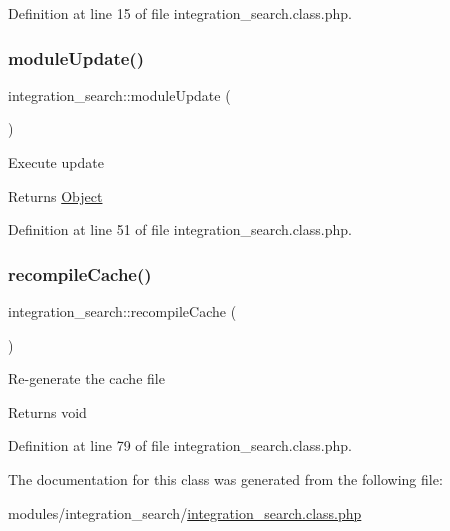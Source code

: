 Definition at line 15 of file integration\+\_\+search.\+class.\+php.

\hypertarget{classintegration__search_a4a0b59c788e9240fada3131b35ef273c}{}\label{classintegration__search_a4a0b59c788e9240fada3131b35ef273c} 
\subsubsection{\texorpdfstring{module\+Update()}{moduleUpdate()}}
{\footnotesize\ttfamily integration\+\_\+search\+::module\+Update (\begin{DoxyParamCaption}{ }\end{DoxyParamCaption})}

Execute update

\begin{DoxyReturn}{Returns}
\hyperlink{classObject}{Object} 
\end{DoxyReturn}


Definition at line 51 of file integration\+\_\+search.\+class.\+php.

\hypertarget{classintegration__search_aaa47663580bb0ec22cf7b419ad47f2af}{}\label{classintegration__search_aaa47663580bb0ec22cf7b419ad47f2af} 
\subsubsection{\texorpdfstring{recompile\+Cache()}{recompileCache()}}
{\footnotesize\ttfamily integration\+\_\+search\+::recompile\+Cache (\begin{DoxyParamCaption}{ }\end{DoxyParamCaption})}

Re-\/generate the cache file

\begin{DoxyReturn}{Returns}
void 
\end{DoxyReturn}


Definition at line 79 of file integration\+\_\+search.\+class.\+php.



The documentation for this class was generated from the following file\+:\begin{DoxyCompactItemize}
\item 
modules/integration\+\_\+search/\hyperlink{integration__search_8class_8php}{integration\+\_\+search.\+class.\+php}\end{DoxyCompactItemize}

